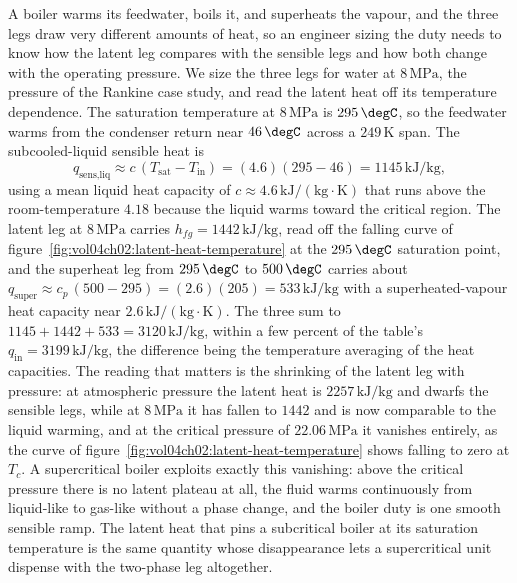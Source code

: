 A boiler warms its feedwater, boils it, and superheats the vapour, and the
three legs draw very different amounts of heat, so an engineer sizing the
duty needs to know how the latent leg compares with the sensible legs and how
both change with the operating pressure. We size the three legs for water at
$8\,\text{MPa}$, the pressure of the Rankine case study, and read the latent
heat off its temperature dependence. The saturation temperature at
$8\,\text{MPa}$ is $295\,\degC$, so the feedwater warms from the condenser
return near $46\,\degC$ across a $249\,\si{\kelvin}$ span. The
subcooled-liquid sensible heat is
\[
q_{\text{sens,liq}} \approx c\,(T_{\text{sat}} - T_{\text{in}}) = (4.6)(295 -
46) = 1145\,\text{kJ}/\text{kg},
\]
using a mean liquid heat capacity of $c \approx 4.6\,\text{kJ}/(\text{kg}\cdot
\si{\kelvin})$ that runs above the room-temperature $4.18$ because the liquid
warms toward the critical region. The latent leg at $8\,\text{MPa}$ carries
$h_{fg} = 1442\,\text{kJ}/\text{kg}$, read off the falling curve of
figure~\ref{fig:vol04ch02:latent-heat-temperature} at the $295\,\degC$
saturation point, and the superheat leg from $295\,\degC$ to $500\,\degC$
carries about $q_{\text{super}} \approx c_p\,(500 - 295) = (2.6)(205) =
533\,\text{kJ}/\text{kg}$ with a superheated-vapour heat capacity near
$2.6\,\text{kJ}/(\text{kg}\cdot\si{\kelvin})$. The three sum to $1145 + 1442 +
533 = 3120\,\text{kJ}/\text{kg}$, within a few percent of the table's
$q_{\text{in}} = 3199\,\text{kJ}/\text{kg}$, the difference being the
temperature averaging of the heat capacities. The reading that matters is the
shrinking of the latent leg with pressure: at atmospheric pressure the latent
heat is $2257\,\text{kJ}/\text{kg}$ and dwarfs the sensible legs, while at
$8\,\text{MPa}$ it has fallen to $1442$ and is now comparable to the liquid
warming, and at the critical pressure of $22.06\,\text{MPa}$ it vanishes
entirely, as the curve of figure~\ref{fig:vol04ch02:latent-heat-temperature}
shows falling to zero at $T_c$. A supercritical boiler exploits exactly this
vanishing: above the critical pressure there is no latent plateau at all, the
fluid warms continuously from liquid-like to gas-like without a phase change,
and the boiler duty is one smooth sensible ramp. The latent heat that pins a
subcritical boiler at its saturation temperature is the same quantity whose
disappearance lets a supercritical unit dispense with the two-phase leg
altogether.



